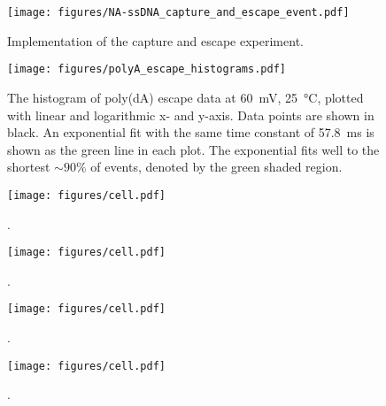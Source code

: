 \begin{figure}[h]
\begin{centering}
\texttt{[image: figures/NA-ssDNA\_capture\_and\_escape\_event.pdf]}
\caption[Capture and escape experiment schematically]{Implementation of the capture and escape experiment.}
\label{fig:capture_escape_event}
\end{centering}
\end{figure}

\begin{figure}[h]
\begin{centering}
\texttt{[image: figures/polyA\_escape\_histograms.pdf]}
\caption[Measured escape times of poly(dA) ssDNA from MspA]{The histogram of poly(dA) escape data at \SI{60}{\mV}, \SI{25}{\celsius}, plotted with linear and logarithmic x- and y-axis.  Data points are shown in black.  An exponential fit with the same time constant of \SI{57.8}{\ms} is shown as the green line in each plot.  The exponential fits well to the shortest $\sim 90\%$ of events, denoted by the green shaded region.}
\label{fig:escape_times}
\end{centering}
\end{figure}

\begin{figure}[h]
\begin{centering}
\texttt{[image: figures/cell.pdf]}
\caption[Measured escape times of homopolymer ssDNA from MspA]{.}
\label{fig:escape_times}
\end{centering}
\end{figure}

\begin{figure}[h]
\begin{centering}
\texttt{[image: figures/cell.pdf]}
\caption[Current blockages for homopolymer ssDNA]{.}
\label{fig:homopolymer_blockages}
\end{centering}
\end{figure}

\begin{figure}[h]
\begin{centering}
\texttt{[image: figures/cell.pdf]}
\caption[Current fluctuations for poly(dC) ssDNA]{.}
\label{fig:polyC_fluctuations}
\end{centering}
\end{figure}

\begin{figure}[h]
\begin{centering}
\texttt{[image: figures/cell.pdf]}
\caption[Current fluctuations for all homopolymer ssDNA]{.}
\label{fig:homopolymer_fluctuations}
\end{centering}
\end{figure}

